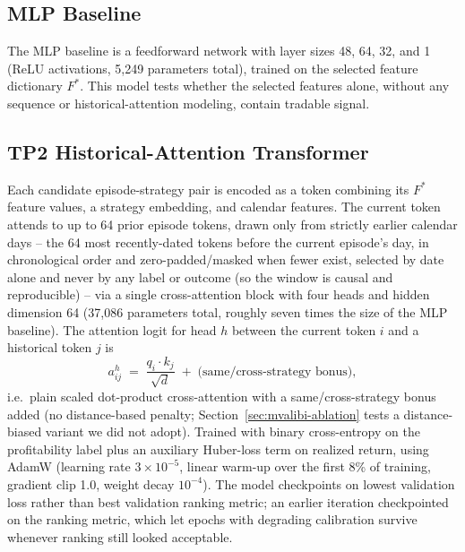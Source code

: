 \documentclass[sigconf,review,anonymous]{acmart}
\begin{document}
\subsection{MLP Baseline}
The MLP baseline is a feedforward network with layer sizes 48, 64, 32, and 1 (ReLU activations, 5{,}249 parameters total), trained on the selected feature dictionary $F^{\ast}$. This model tests whether the selected features alone, without any sequence or historical-attention modeling, contain tradable signal.

\subsection{TP2 Historical-Attention Transformer}
\label{sec:transformer}
Each candidate episode-strategy pair is encoded as a token combining its $F^{\ast}$ feature values, a strategy embedding, and calendar features. The current token attends to up to 64 prior episode tokens, drawn only from strictly earlier calendar days -- the 64 most recently-dated tokens before the current episode's day, in chronological order and zero-padded/masked when fewer exist, selected by date alone and never by any label or outcome (so the window is causal and reproducible) -- via a single cross-attention block with four heads and hidden dimension 64 (37{,}086 parameters total, roughly seven times the size of the MLP baseline). The attention logit for head $h$ between the current token $i$ and a historical token $j$ is
\[
a_{ij}^{h} \;=\; \frac{q_i \cdot k_j}{\sqrt{d}} \;+\; \text{(same/cross-strategy bonus)},
\]
i.e.\ plain scaled dot-product cross-attention with a same/cross-strategy bonus added (no distance-based penalty; Section~\ref{sec:mvalibi-ablation} tests a distance-biased variant we did not adopt). Trained with binary cross-entropy on the profitability label plus an auxiliary Huber-loss term on realized return, using AdamW (learning rate $3\times10^{-5}$, linear warm-up over the first 8\% of training, gradient clip 1.0, weight decay $10^{-4}$). The model checkpoints on lowest validation loss rather than best validation ranking metric; an earlier iteration checkpointed on the ranking metric, which let epochs with degrading calibration survive whenever ranking still looked acceptable.
\end{document}
